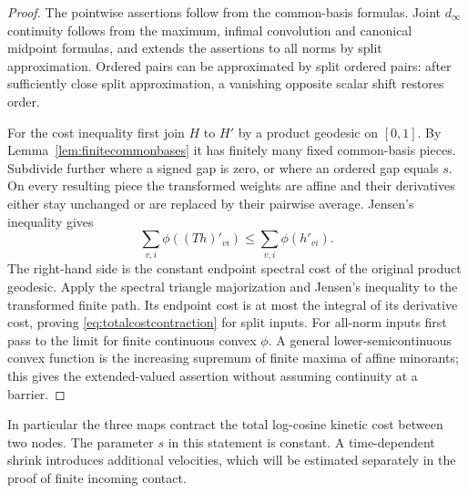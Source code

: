 \begin{proof}
The pointwise assertions follow from the common-basis formulas.
Joint $d_\infty$ continuity follows from the maximum, infimal
convolution and canonical midpoint formulas, and extends the assertions
to all norms by split approximation. Ordered pairs can be approximated
by split ordered pairs: after sufficiently close split approximation,
a vanishing opposite scalar shift restores order.

For the cost inequality first join $H$ to $H'$ by a product geodesic
on $[0,1]$. By Lemma~\ref{lem:finitecommonbases} it has finitely many
fixed common-basis pieces. Subdivide further where a signed gap is
zero, or where an ordered gap equals $s$. On every resulting piece
the transformed weights are affine and their derivatives either stay
unchanged or are replaced by their pairwise average. Jensen's
inequality gives
\[
 \sum_{v,i}\phi((Th)'_{vi})\le\sum_{v,i}\phi(h'_{vi}).
\]
The right-hand side is the constant endpoint spectral cost of the
original product geodesic. Apply the spectral triangle majorization
and Jensen's inequality to the transformed finite path. Its endpoint
cost is at most the integral of its derivative cost, proving
\eqref{eq:totalcostcontraction} for split inputs. For all-norm inputs
first pass to the limit for finite continuous convex $\phi$. A general
lower-semicontinuous convex function is the increasing supremum of
finite maxima of affine minorants; this gives the extended-valued
assertion without assuming continuity at a barrier.
\end{proof}

In particular the three maps contract the total log-cosine kinetic
cost between two nodes. The parameter $s$ in this statement is constant.
A time-dependent shrink introduces additional velocities, which will
be estimated separately in the proof of finite incoming contact.
